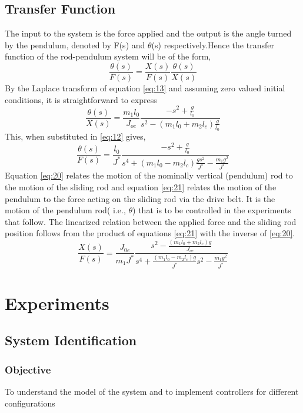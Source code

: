 \documentclass[12pt, a4paper]{article}
\begin{document}
\subsection{Transfer Function}
The input to the system is the force applied and the output is the angle turned by the pendulum, denoted by F(s) and $\theta$(s) respectively.Hence the transfer function of the rod-pendulum system will be of the form,
\begin{equation}\label{eq:19}
\frac{\theta(s)}{F(s)} = \frac{X(s)}{F(s)}\frac{\theta(s)}{X(s)}
\end{equation}
By the Laplace transform of equation \eqref{eq:13} and assuming zero valued initial conditions, it is straightforward to express
\begin{equation}\label{eq:20}
\frac{\theta(s)}{X(s)} = \frac{m_1l_0}{J_{oe}}\frac{-s^2 + \frac{g}{l_0}}{s^2 - (m_1l_0 + m_2l_c)\frac{g}{l_0}}
\end{equation}
This, when substituted in \eqref{eq:12} gives,
\begin{equation}\label{eq:21}
\frac{\theta(s)}{F(s)} = \frac{l_0}{J^*}\frac{-s^2 + \frac{g}{l_0}}{s^4 + (m_1l_0 - m_2l_c)\frac{gs^2}{J^*} - \frac{m_1g^2}{J^*}}
\end{equation}
Equation \eqref{eq:20} relates the motion of the nominally vertical (pendulum) rod to the motion of the sliding rod and equation \eqref{eq:21} relates the motion of the pendulum to the force acting on the sliding rod via the drive belt. It is the motion of the pendulum rod( i.e., $\theta$) that is to be controlled in the experiments that follow. The linearized relation between the applied force and the sliding rod position follows from the product of equations \eqref{eq:21} with the inverse of \eqref{eq:20}.
\begin{equation}\label{eq:22}
\frac{X(s)}{F(s)} = \frac{J_{0e}}{m_1J^*}\frac{s^2 - \frac{(m_1l_0+m_2l_c)g}{J_{oe}}}{s^4 + \frac{(m_1l_0 - m_2l_c)g}{J^*}s^2 - \frac{m_1g^2}{J^*}}
\end{equation}
\section{Experiments}
\subsection{System Identification}
\subsubsection{Objective}
To understand the model of the system and to implement controllers for different configurations
\end{document}
